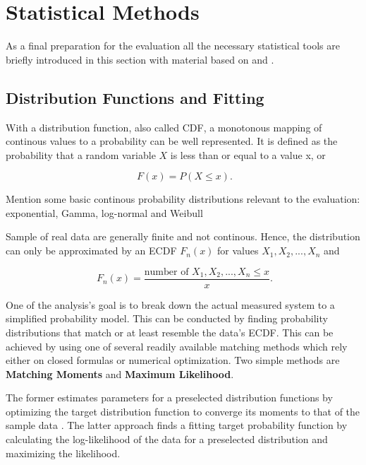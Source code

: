 \section{Statistical Methods}

As a final preparation for the evaluation all the necessary statistical tools are briefly introduced in this section with material based on \cite{field2012discovering} and \cite{Knuth:1997:ACP:270146}.



\subsection{Distribution Functions and Fitting}

With a distribution function, also called \gls{CDF}, a monotonous mapping of continous values to a probability can be well represented. It is defined as the probability that a random variable $X$ is less than or equal to a value x, or

\begin{equation}
\phantom{.} F(x) = P(X\leq x)\text{.}
\end{equation}

Mention some basic continous probability distributions relevant to the evaluation: exponential, Gamma, log-normal and Weibull

Sample of real data are generally finite and not continous. Hence, the distribution can only be approximated by an \gls{ECDF} $F_n(x)$ for values $X_1, X_2, ... , X_n$ and 

\begin{equation}
\phantom{.}F_n(x) = \frac{\text{number of }X_1, X_2, ... , X_n \leq x}{x}\text{.}
\end{equation}


One of the analysis's goal is to break down the actual measured system to a simplified probability model. This can be conducted by finding probability distributions that match or at least resemble the data's \gls{ECDF}. This can be achieved by using one of several readily available matching methods which rely either on closed formulas or numerical optimization. Two simple methods are \textbf{Matching Moments} and \textbf{Maximum Likelihood}.

The former estimates parameters for a preselected distribution functions by optimizing the target distribution function to converge its moments to that of the sample data  \cite[pp.~99-143]{vose2000risk}. The latter approach finds a fitting target probability function by calculating the log-likelihood of the data for a preselected distribution and maximizing the likelihood.

